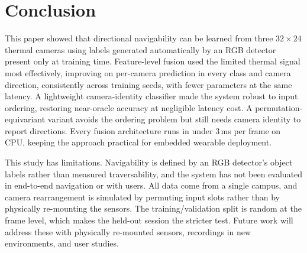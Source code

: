 \section{Conclusion}

This paper showed that directional navigability can be learned from three
$32\times24$ thermal cameras using labels generated automatically by an RGB
detector present only at training time. Feature-level fusion used the limited
thermal signal most effectively, improving on per-camera prediction in every
class and camera direction, consistently across training seeds, with fewer
parameters at the same latency. A lightweight camera-identity
classifier made the system robust to input ordering, restoring
near-oracle accuracy at negligible latency cost. A permutation-equivariant
variant avoids the ordering problem but still needs camera identity to report
directions. Every fusion
architecture runs in under 3\,ms per frame on CPU, keeping the approach practical for
embedded wearable deployment.

This study has limitations. Navigability is defined by an RGB detector's
object labels rather than measured traversability, and the system has not been
evaluated in end-to-end navigation or with users. All data come from a single
campus, and camera rearrangement is simulated by permuting input slots rather
than by physically re-mounting the sensors. The training/validation split is
random at the frame level, which makes the held-out session the stricter test.
Future work will address these
with physically re-mounted sensors, recordings in new environments, and user
studies.
